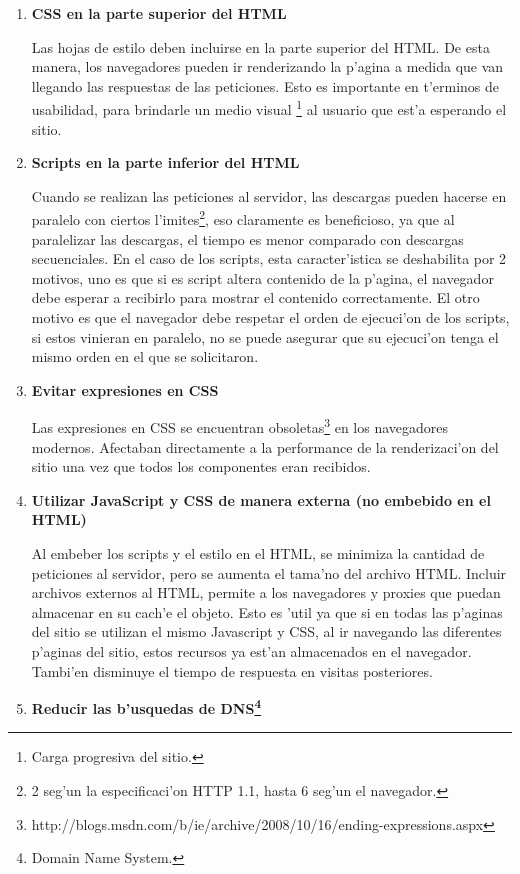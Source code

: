 \begin{enumerate}
Los tipos de archivos que se deber'ian comprimir son aquellos de texto, tales como HTML, scripts, CSS, etc. Aquellos formatos que ya se encuentran comprimidos como las im'agenes o los archivos PDF\footnote{Portable Document Format.} no deber'ian comprimirse ya que se desperdicia tiempo de CPU del servidor\footnote{Para realizar la compresi'on.} y adem'as puede incluso incrementar el tama'no del archivo.

\item \textbf{CSS en la parte superior del HTML}

Las hojas de estilo deben incluirse en la parte superior del HTML. De esta manera, los navegadores pueden ir renderizando la p'agina a medida que van llegando las respuestas de las peticiones. Esto es importante en t'erminos de usabilidad, para brindarle un medio visual \footnote{Carga progresiva del sitio.} al usuario que est'a esperando el sitio.
\item \textbf{Scripts en la parte inferior del HTML}

Cuando se realizan las peticiones al servidor, las descargas pueden hacerse en paralelo con ciertos l'imites\footnote{2 seg'un la especificaci'on HTTP 1.1, hasta 6 seg'un el navegador.}, eso claramente es beneficioso, ya que al paralelizar las descargas, el tiempo es menor comparado con descargas secuenciales. En el caso de los scripts, esta caracter'istica se deshabilita por 2 motivos, uno es que si es script altera contenido de la p'agina, el navegador debe esperar a recibirlo para mostrar el contenido correctamente. El otro motivo es que el navegador debe respetar el orden de ejecuci'on de los scripts, si estos vinieran en paralelo, no se puede asegurar que su ejecuci'on tenga el mismo orden en el que se solicitaron.
\clearpage
\item \textbf{Evitar expresiones en CSS}

Las expresiones en CSS se encuentran obsoletas\footnote{http://blogs.msdn.com/b/ie/archive/2008/10/16/ending-expressions.aspx} en los navegadores modernos. Afectaban directamente a la performance de la renderizaci'on del sitio una vez que todos los componentes eran recibidos.
\item \textbf{Utilizar JavaScript y CSS de manera externa (no embebido en el HTML)}

Al embeber los scripts y el estilo en el HTML, se minimiza la cantidad de peticiones al servidor, pero se aumenta el tama'no del archivo HTML. Incluir archivos externos al HTML, permite a los navegadores y proxies que puedan almacenar en su cach'e el objeto. Esto es 'util ya que si en todas las p'aginas del sitio se utilizan el mismo Javascript y CSS, al ir navegando las diferentes p'aginas del sitio, estos recursos ya est'an almacenados en el navegador. Tambi'en disminuye el tiempo de respuesta en visitas posteriores.
\item \textbf{Reducir las b'usquedas de DNS\footnote{Domain Name System.}}


\end{enumerate}
